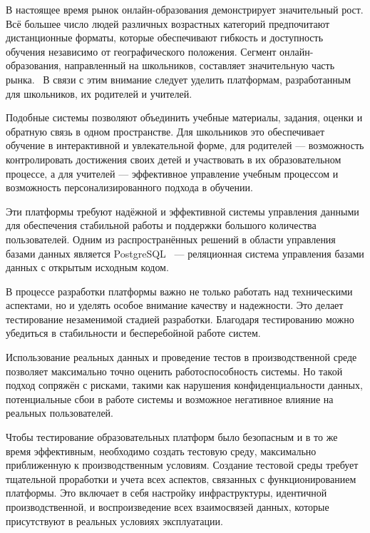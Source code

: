 \introduction %

В настоящее время рынок онлайн-образования демонстрирует значительный рост. Всё большее число людей различных возрастных категорий предпочитают дистанционные форматы, которые обеспечивают гибкость и доступность обучения независимо от географического положения. Сегмент онлайн-образования, направленный на школьников, составляет значительную часть рынка.~\cite{online-edu-research} В связи с этим внимание следует уделить платформам, разработанным для школьников, их родителей и учителей.

Подобные системы позволяют объединить учебные материалы, задания, оценки и обратную связь в одном пространстве. Для школьников это обеспечивает обучение в интерактивной и увлекательной форме, для родителей — возможность контролировать достижения своих детей и участвовать в их образовательном процессе, а для учителей — эффективное управление учебным процессом и возможность персонализированного подхода в обучении.

Эти платформы требуют надёжной и эффективной системы управления данными для обеспечения стабильной работы и поддержки большого количества пользователей. Одним из распространённых решений в области управления базами данных является PostgreSQL~\cite{postgresql} — реляционная система управления базами данных с открытым исходным кодом.

В процессе разработки платформы важно не только работать над техническими аспектами, но и уделять особое внимание качеству и надежности. Это делает тестирование незаменимой стадией разработки. Благодаря тестированию можно убедиться в стабильности и бесперебойной работе систем.

Использование реальных данных и проведение тестов в производственной среде позволяет максимально точно оценить работоспособность системы. Но такой подход сопряжён с рисками, такими как нарушения конфиденциальности данных, потенциальные сбои в работе системы и возможное негативное влияние на реальных пользователей.

Чтобы тестирование образовательных платформ было безопасным и в то же время эффективным, необходимо создать тестовую среду, максимально приближенную к производственным условиям. Создание тестовой среды требует тщательной проработки и учета всех аспектов, связанных с функционированием платформы. Это включает в себя настройку инфраструктуры, идентичной производственной, и воспроизведение всех взаимосвязей данных, которые присутствуют в реальных условиях эксплуатации.

